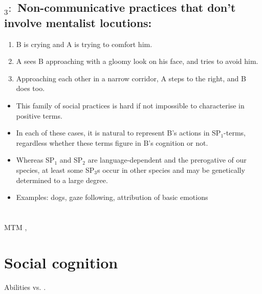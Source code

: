 \documentclass[12pt]{article}
\begin{document}
\subsection*{$_3:$ Non-communicative practices that don't involve mentalist locutions:}
\begin{enumerate}{--}\itemsep=.2ex
\item B is crying and A is trying to comfort him.
\item A sees B approaching with a gloomy look on his face, and tries to avoid him.
\item Approaching each other in a narrow corridor, A steps to the right, and B does too.
\end{enumerate}
\begin{itemize}
\item This family of social practices is hard if not impossible to characterise in positive terms.
\item In each of these cases, it is natural to represent B's actions in SP$_1$-terms, regardless whether these terms figure in B's cognition or not.
\item Whereas SP$_1$ and SP$_2$ are language-dependent and the prerogative of our species, at least some SP$_3$s occur in other species and may be genetically determined to a large degree. 
\item Examples: dogs, gaze following, attribution of basic emotions \cite{Goldie:2002}
\end{itemize}

\section{}
MTM \cite{Butterfill:2013}, 

\section{Social cognition}

Abilities vs. .
\end{document}
